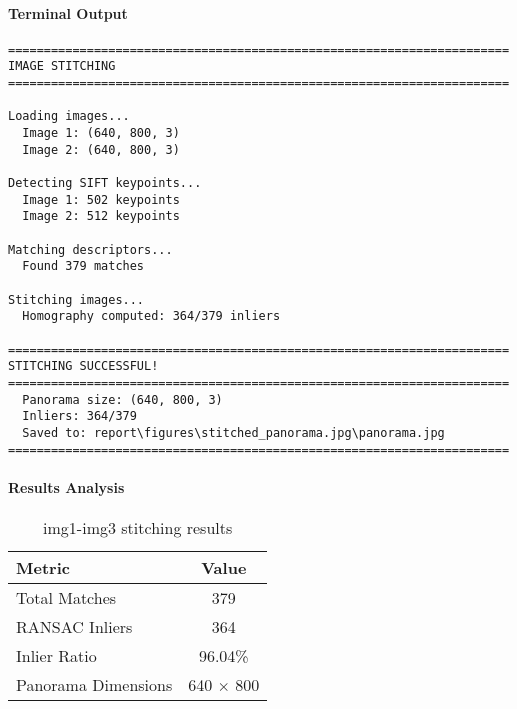 \documentclass[12pt,a4paper]{article}
\begin{document}
\paragraph{Terminal Output}
\begin{lstlisting}
======================================================================
IMAGE STITCHING
======================================================================

Loading images...
  Image 1: (640, 800, 3)
  Image 2: (640, 800, 3)

Detecting SIFT keypoints...
  Image 1: 502 keypoints
  Image 2: 512 keypoints

Matching descriptors...
  Found 379 matches

Stitching images...
  Homography computed: 364/379 inliers

======================================================================
STITCHING SUCCESSFUL!
======================================================================
  Panorama size: (640, 800, 3)
  Inliers: 364/379
  Saved to: report\figures\stitched_panorama.jpg\panorama.jpg
======================================================================
\end{lstlisting}

\paragraph{Results Analysis}
\begin{table}[H]
\centering
\begin{tabular}{@{}lc@{}}
\toprule
\textbf{Metric} & \textbf{Value} \\
\midrule
Total Matches & 379 \\
RANSAC Inliers & 364 \\
Inlier Ratio & 96.04\% \\
Panorama Dimensions & 640 $\times$ 800 \\
\bottomrule
\end{tabular}
\caption{img1-img3 stitching results}
\end{table}
\end{document}
